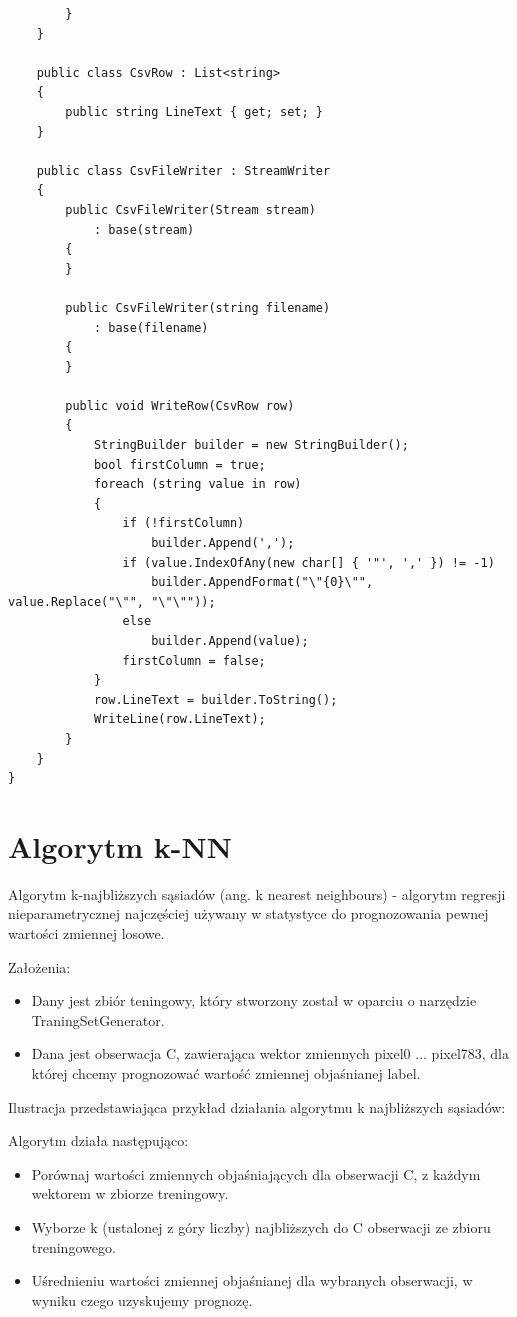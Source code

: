 \documentclass[brudnopis]{xmgr}
\begin{document}
\begin{lstlisting}
        }
    }

    public class CsvRow : List<string>
    {
        public string LineText { get; set; }
    }

    public class CsvFileWriter : StreamWriter
    {
        public CsvFileWriter(Stream stream)
            : base(stream)
        {
        }

        public CsvFileWriter(string filename)
            : base(filename)
        {
        }

        public void WriteRow(CsvRow row)
        {
            StringBuilder builder = new StringBuilder();
            bool firstColumn = true;
            foreach (string value in row)
            {
                if (!firstColumn)
                    builder.Append(',');
                if (value.IndexOfAny(new char[] { '"', ',' }) != -1)
                    builder.AppendFormat("\"{0}\"", value.Replace("\"", "\"\""));
                else
                    builder.Append(value);
                firstColumn = false;
            }
            row.LineText = builder.ToString();
            WriteLine(row.LineText);
        }
    }
}
\end{lstlisting}

\section{Algorytm k-NN}

Algorytm k-najbliższych sąsiadów (ang. k nearest neighbours) - algorytm regresji nieparametrycznej najczęściej używany w statystyce do prognozowania pewnej wartości zmiennej losowe.

Założenia:
\begin{itemize}
\item
Dany jest zbiór teningowy, który stworzony został w oparciu o narzędzie TraningSetGenerator.
\item
Dana jest obserwacja C, zawierająca wektor zmiennych pixel0 ... pixel783, dla której chcemy prognozować wartość zmiennej objaśnianej label.
\end{itemize}	

   Ilustracja przedstawiająca przykład działania algorytmu k najbliższych sąsiadów:

Algorytm działa następująco:
\begin{itemize}
\item
Porównaj wartości zmiennych objaśniających dla obserwacji C, z każdym wektorem w zbiorze treningowy.
\item
Wyborze k (ustalonej z góry liczby) najbliższych do C obserwacji ze zbioru treningowego.
\item
Uśrednieniu wartości zmiennej objaśnianej dla wybranych obserwacji, w wyniku czego uzyskujemy prognozę.	
\end{itemize}	
     
\end{document}

